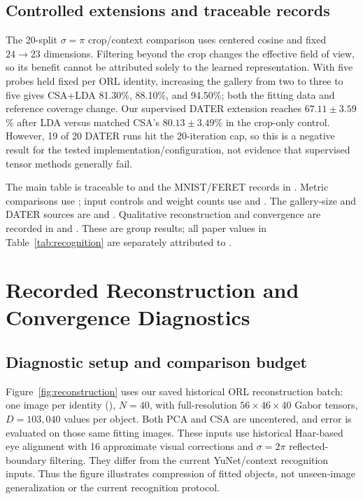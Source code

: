 \subsection{Controlled extensions and traceable records}
\label{app:controls}
The 20-split $\sigma=\pi$ crop/context comparison uses centered cosine and fixed
$24\to23$ dimensions. Filtering beyond the crop changes the effective field of
view, so its benefit cannot be attributed solely to the learned representation.
With five probes held fixed per ORL identity, increasing the gallery from two
to three to five gives CSA+LDA 81.30\%, 88.10\%, and 94.50\%; both the fitting
data and reference coverage change.
Our supervised DATER extension \citep{yan2005dater} reaches
$67.11\pm3.59$\% after LDA versus matched CSA's $80.13\pm3.49$\% in the crop-only
control. However, 19 of 20 DATER runs hit the 20-iteration cap, so this is a
negative result for the tested implementation/configuration, not evidence that
supervised tensor methods generally fail.

{\raggedright
The main table is traceable to
 and the MNIST/FERET records in
.
Metric comparisons use ;
input controls and weight counts use 
and .
The gallery-size and DATER sources are 
and . Qualitative reconstruction and
convergence are recorded in 
and .
These are group results; all paper values in Table~\ref{tab:recognition}
are separately attributed to \citet{xu2008csa}.\par}

\clearpage
\section{Recorded Reconstruction and Convergence Diagnostics}
\label{app:reconstruction}
\subsection{Diagnostic setup and comparison budget}
Figure~\ref{fig:reconstruction} uses our saved historical ORL reconstruction
batch: one image per identity (), $N=40$, with full-resolution
$56\times46\times40$ Gabor tensors, $D=103{,}040$ values per object.
Both PCA and CSA are uncentered, and error is evaluated on those same fitting
images. These inputs use historical Haar-based eye alignment with 16 approximate
visual corrections and $\sigma=2\pi$ reflected-boundary filtering. They differ from
the current YuNet/context recognition inputs. Thus the figure illustrates
compression of fitted objects, not unseen-image generalization or the current
recognition protocol.

